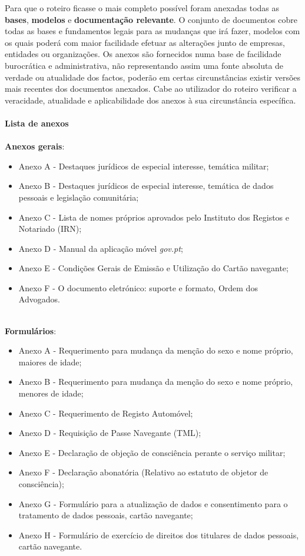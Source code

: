 Para que o roteiro ficasse o mais completo possível foram anexadas todas
as \textbf{bases}, \textbf{modelos} e \textbf{documentação relevante}. O
conjunto de documentos cobre todas as bases e fundamentos legais para as
mudanças que irá fazer, modelos com os quais poderá com maior facilidade
efetuar as alterações junto de empresas, entidades ou organizações. Os
anexos são fornecidos numa base de facilidade burocrática e
administrativa, não representando assim uma fonte absoluta de verdade ou
atualidade dos factos, poderão em certas circunstâncias existir versões
mais recentes dos documentos anexados. Cabe ao utilizador do roteiro
verificar a veracidade, atualidade e aplicabilidade dos anexos à sua
circunstância específica. \\
\\
\textbf{Lista de anexos} \\[4pt]
\\
\textbf{Anexos gerais}:
\begin{itemize}
	\item Anexo A - Destaques jurídicos de especial interesse, temática militar;
	\item Anexo B - Destaques jurídicos de especial interesse, temática de dados pessoais e legislação comunitária;
	\item Anexo C - Lista de nomes próprios aprovados pelo Instituto dos Registos e Notariado (IRN);
	\item Anexo D - Manual da aplicação móvel \emph{gov.pt};
	\item Anexo E - Condições Gerais de Emissão e Utilização do Cartão navegante;
	\item Anexo F - O documento eletrónico: suporte e formato, Ordem dos Advogados.
\end{itemize}
\leavevmode\\
\textbf{Formulários}:
\begin{itemize}
	\item Anexo A - Requerimento para mudança da menção do sexo e nome próprio, maiores de idade;
	\item Anexo B - Requerimento para mudança da menção do sexo e nome próprio, menores de idade;
	\item Anexo C - Requerimento de Registo Automóvel;
	\item Anexo D - Requisição de Passe Navegante (TML);
	\item Anexo E - Declaração de objeção de consciência perante o serviço militar;
	\item Anexo F - Declaração abonatória (Relativo ao estatuto de objetor de consciência);
	\item Anexo G - Formulário para a atualização de dados e consentimento para o tratamento de dados pessoais, cartão navegante;
	\item Anexo H - Formulário de exercício de direitos dos titulares de dados pessoais, cartão navegante.
\end{itemize}
\leavevmode\\

